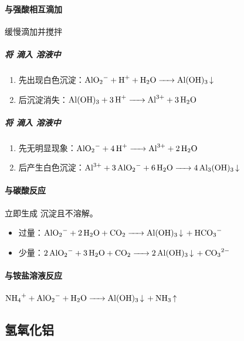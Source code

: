 \paragraph{与强酸相互滴加}缓慢滴加并搅拌

\subparagraph{将 滴入 溶液中}

\begin{enumerate}
	\item 先出现白色沉淀：$\ce{AlO2- + H+ + H2O -> Al(OH)3 v}\\$
	\item 后沉淀消失：$\ce{Al(OH)3 + 3H+ -> Al^3+ + 3H2O}\\$
\end{enumerate}

\subparagraph{将 滴入 溶液中}

\begin{enumerate}
	\item 先无明显现象：$\ce{AlO2- + 4H+ -> Al^3+ + 2H2O}\\$
	\item 后产生白色沉淀：$\ce{Al^3+ + 3AlO2- + 6H2O -> 4Al3(OH)3 v}\\$
\end{enumerate}

\paragraph{与碳酸反应}

立即生成 沉淀且不溶解。

\begin{itemize}
	\item {}过量：$\ce{AlO2- + 2H2O + CO2 -> Al(OH)3 v + HCO3-}\\$
	\item {}少量：$\ce{2AlO2- + 3H2O + CO2 -> 2Al(OH)3 v + CO3^2-}\\$
\end{itemize}

\paragraph{与铵盐溶液反应}

$\ce{NH4+ + AlO2- + H2O -> Al(OH)3 v + NH3 ^}\\$


\subsection{氢氧化铝}

